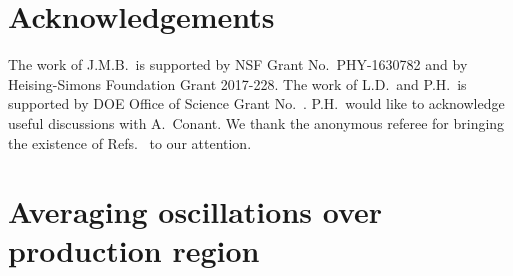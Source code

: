 \documentclass[prd, twocolumn, tightenlines, twoside, secnumarabic, superscriptaddress, preprintnumbers, nofootinbib, notitlepage]{revtex4-1}
\begin{document}
\section*{Acknowledgements}
The work of J.M.B.~is supported by NSF Grant No.~PHY-1630782 and by Heising-Simons Foundation Grant 2017-228. The work of L.D.~and P.H.~is supported by DOE Office of Science Grant No.~. P.H.~would like to acknowledge useful discussions with A.~Conant. We thank the anonymous referee for bringing the existence of Refs.~\cite{Heeger:2012tc, Heeger:2013ema, Lyashuk:2016lpn} to our attention.


\appendix
\setcounter{equation}{0}

\section{Averaging oscillations over production region}
\label{app:averaging}
\end{document}
